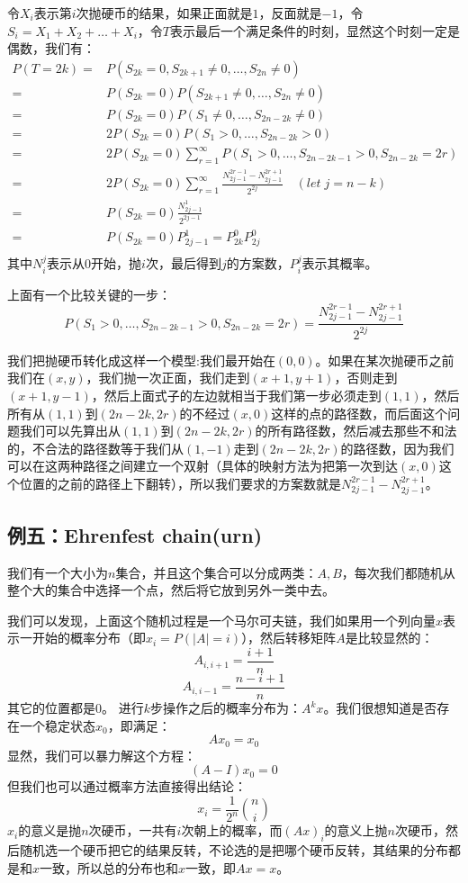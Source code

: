 		\proof 令$X_i$表示第$i$次抛硬币的结果，如果正面就是$1$，反面就是$-1$，令$S_i=X_1+X_2+\dots+X_i$，令$T$表示最后一个满足条件的时刻，显然这个时刻一定是偶数，我们有：
		\[ \begin{split}
			P(T=2k) = & P(S_{2k}=0,S_{2k+1}\neq0,\dots,S_{2n}\neq0) \\
					= & P(S_{2k}=0)P(S_{2k+1}\neq0,\dots,S_{2n}\neq0) \\
					= & P(S_{2k}=0)P(S_1\neq0,\dots,S_{2n-2k}\neq0) \\
					= & 2P(S_{2k}=0)P(S_1>0,\dots,S_{2n-2k}>0) \\
					= & 2P(S_{2k}=0)\sum_{r=1}^{\infty}P(S_1>0,\dots,S_{2n-2k-1}>0,S_{2n-2k}=2r) \\
					= & 2P(S_{2k}=0)\sum_{r=1}^{\infty}\frac{N_{2j-1}^{2r-1}-N_{2j-1}^{2r+1}}{2^{2j}}	\quad (let \; j = n-k)\\
					= & P(S_{2k}=0)\frac{N_{2j-1}^{1}}{2^{2j-1}} \\
					= & P(S_{2k}=0)P_{2j-1}^{1} = P_{2k}^{0}P_{2j}^{0} \\
		\end{split}	\]
		其中$N_i^j$表示从$0$开始，抛$i$次，最后得到$j$的方案数，$P_i^j$表示其概率。
		
		上面有一个比较关键的一步：
		$$
		P(S_1>0,\dots,S_{2n-2k-1}>0,S_{2n-2k}=2r) = \frac{N_{2j-1}^{2r-1}-N_{2j-1}^{2r+1}}{2^{2j}}
		$$
		
		我们把抛硬币转化成这样一个模型:我们最开始在$(0,0)$。如果在某次抛硬币之前我们在$(x,y)$，我们抛一次正面，我们走到$(x+1,y+1)$，否则走到$(x+1,y-1)$，然后上面式子的左边就相当于我们第一步必须走到$(1,1)$，然后所有从$(1,1)$到$(2n-2k,2r)$的不经过$(x,0)$这样的点的路径数，而后面这个问题我们可以先算出从$(1,1)$到$(2n-2k,2r)$的所有路径数，然后减去那些不和法的，不合法的路径数等于我们从$(1,-1)$走到$(2n-2k,2r)$的路径数，因为我们可以在这两种路径之间建立一个双射（具体的映射方法为把第一次到达$(x,0)$这个位置的之前的路径上下翻转），所以我们要求的方案数就是$N_{2j-1}^{2r-1}-N_{2j-1}^{2r+1}$。
		
		\subsection{例五：Ehrenfest chain(urn)}
		我们有一个大小为$n$集合，并且这个集合可以分成两类：$A, B$，每次我们都随机从整个大的集合中选择一个点，然后将它放到另外一类中去。
		
		我们可以发现，上面这个随机过程是一个马尔可夫链，我们如果用一个列向量$x$表示一开始的概率分布（即$x_i = P(\lvert A\rvert=i)$），然后转移矩阵$A$是比较显然的：
		$$
			A_{i,i+1} = \frac{i+1}{n}
		$$
		$$
			A_{i,i-1} = \frac{n-i+1}{n}
		$$
		其它的位置都是$0$。
		进行$k$步操作之后的概率分布为：$A^kx$。我们很想知道是否存在一个稳定状态$x_0$，即满足：
		$$
			Ax_0 = x_0
		$$
		显然，我们可以暴力解这个方程：
		$$
			(A-I)x_0 = 0
		$$
		但我们也可以通过概率方法直接得出结论：
		$$
			x_i = \frac{1}{2^n} \binom{n}{i}
		$$
		$x_i$的意义是抛$n$次硬币，一共有$i$次朝上的概率，而$(Ax)_i$的意义上抛$n$次硬币，然后随机选一个硬币把它的结果反转，不论选的是把哪个硬币反转，其结果的分布都是和$x$一致，所以总的分布也和$x$一致，即$Ax=x$。
